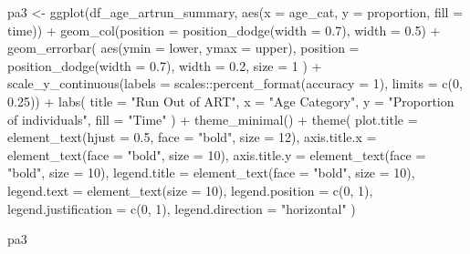 \documentclass[
  letterpaper,
  DIV=11,
  numbers=noendperiod]{scrartcl}
\newenvironment{Shaded}{\begin{snugshade}}{\end{snugshade}}
\newcommand{\AttributeTok}[1]{\textcolor[rgb]{0.40,0.45,0.13}{#1}}
\newcommand{\DecValTok}[1]{\textcolor[rgb]{0.68,0.00,0.00}{#1}}
\newcommand{\FloatTok}[1]{\textcolor[rgb]{0.68,0.00,0.00}{#1}}
\newcommand{\FunctionTok}[1]{\textcolor[rgb]{0.28,0.35,0.67}{#1}}
\newcommand{\NormalTok}[1]{\textcolor[rgb]{0.00,0.23,0.31}{#1}}
\newcommand{\OtherTok}[1]{\textcolor[rgb]{0.00,0.23,0.31}{#1}}
\newcommand{\SpecialCharTok}[1]{\textcolor[rgb]{0.37,0.37,0.37}{#1}}
\newcommand{\StringTok}[1]{\textcolor[rgb]{0.13,0.47,0.30}{#1}}
\begin{document}
\begin{Shaded}
\begin{Highlighting}[]
\NormalTok{pa3 }\OtherTok{\textless{}{-}} \FunctionTok{ggplot}\NormalTok{(df\_age\_artrun\_summary, }\FunctionTok{aes}\NormalTok{(}\AttributeTok{x =}\NormalTok{ age\_cat, }\AttributeTok{y =}\NormalTok{ proportion, }\AttributeTok{fill =}\NormalTok{ time)) }\SpecialCharTok{+}
  \FunctionTok{geom\_col}\NormalTok{(}\AttributeTok{position =} \FunctionTok{position\_dodge}\NormalTok{(}\AttributeTok{width =} \FloatTok{0.7}\NormalTok{), }\AttributeTok{width =} \FloatTok{0.5}\NormalTok{) }\SpecialCharTok{+}
  \FunctionTok{geom\_errorbar}\NormalTok{(}
    \FunctionTok{aes}\NormalTok{(}\AttributeTok{ymin =}\NormalTok{ lower, }\AttributeTok{ymax =}\NormalTok{ upper),}
    \AttributeTok{position =} \FunctionTok{position\_dodge}\NormalTok{(}\AttributeTok{width =} \FloatTok{0.7}\NormalTok{),}
    \AttributeTok{width =} \FloatTok{0.2}\NormalTok{,}
    \AttributeTok{size =} \DecValTok{1}
\NormalTok{  ) }\SpecialCharTok{+}
  \FunctionTok{scale\_y\_continuous}\NormalTok{(}\AttributeTok{labels =}\NormalTok{ scales}\SpecialCharTok{::}\FunctionTok{percent\_format}\NormalTok{(}\AttributeTok{accuracy =} \DecValTok{1}\NormalTok{), }\AttributeTok{limits =} \FunctionTok{c}\NormalTok{(}\DecValTok{0}\NormalTok{, }\FloatTok{0.25}\NormalTok{)) }\SpecialCharTok{+}
  \FunctionTok{labs}\NormalTok{(}
   \AttributeTok{title =} \StringTok{"Run Out of ART"}\NormalTok{,}
    \AttributeTok{x =} \StringTok{"Age Category"}\NormalTok{,}
    \AttributeTok{y =} \StringTok{"Proportion of individuals"}\NormalTok{,}
    \AttributeTok{fill =} \StringTok{"Time"}
\NormalTok{  ) }\SpecialCharTok{+}
  \FunctionTok{theme\_minimal}\NormalTok{() }\SpecialCharTok{+}
  \FunctionTok{theme}\NormalTok{(}
    \AttributeTok{plot.title =} \FunctionTok{element\_text}\NormalTok{(}\AttributeTok{hjust =} \FloatTok{0.5}\NormalTok{, }\AttributeTok{face =} \StringTok{"bold"}\NormalTok{, }\AttributeTok{size =} \DecValTok{12}\NormalTok{),}
    \AttributeTok{axis.title.x =} \FunctionTok{element\_text}\NormalTok{(}\AttributeTok{face =} \StringTok{"bold"}\NormalTok{, }\AttributeTok{size =} \DecValTok{10}\NormalTok{),}
    \AttributeTok{axis.title.y =} \FunctionTok{element\_text}\NormalTok{(}\AttributeTok{face =} \StringTok{"bold"}\NormalTok{, }\AttributeTok{size =} \DecValTok{10}\NormalTok{),}
    \AttributeTok{legend.title =} \FunctionTok{element\_text}\NormalTok{(}\AttributeTok{face =} \StringTok{"bold"}\NormalTok{, }\AttributeTok{size =} \DecValTok{10}\NormalTok{),}
    \AttributeTok{legend.text =} \FunctionTok{element\_text}\NormalTok{(}\AttributeTok{size =} \DecValTok{10}\NormalTok{),}
    \AttributeTok{legend.position =} \FunctionTok{c}\NormalTok{(}\DecValTok{0}\NormalTok{, }\DecValTok{1}\NormalTok{),}
    \AttributeTok{legend.justification =} \FunctionTok{c}\NormalTok{(}\DecValTok{0}\NormalTok{, }\DecValTok{1}\NormalTok{),}
    \AttributeTok{legend.direction =} \StringTok{"horizontal"}
\NormalTok{  )}

\NormalTok{pa3}
\end{Highlighting}
\end{Shaded}
\end{document}
